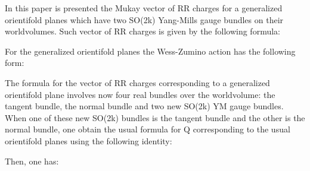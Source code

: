 \documentclass[a4paper,a4paper]{article}
\begin{document}
In this paper is presented the Mukay vector of RR charges for a generalized
orientifold planes which have two SO(2k) Yang-Mills gauge bundles on their worldvolumes.  Such vector of RR charges is given by the following formula:

\begin{center}
{  \coordHE{} }
\end{center}

For the generalized  orientifold planes the Wess-Zumino action has the following form:

\begin{center}
{  \coordHE{} }
\end{center}

The formula for the vector of RR charges corresponding to a generalized orientifold plane involves now four real bundles over the worldvolume: the 
tangent bundle, the normal bundle and two new SO(2k) YM gauge bundles.
When one of these new SO(2k) bundles is the tangent bundle and the other is the normal bundle, one obtain the usual formula for Q corresponding to the usual orientifold planes using the following identity:

\begin{center}
 
{  \coordHE{}}
\end{center} 

Then, one has:

\begin{center}
{  \coordHE{} }
\end{center}

\begin{center}
{  \coordHE{} }
\end{center}
\end{document}
